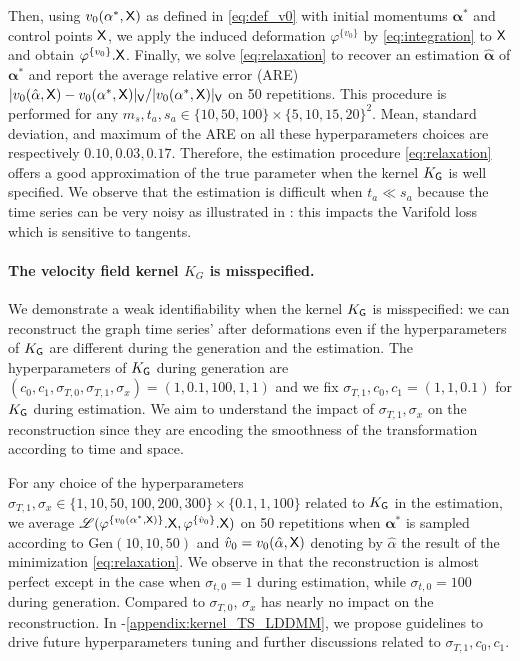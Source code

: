 Then, using $v_0(\mathbf{\alpha}^*,\mathsf{X})$ as defined in \eqref{eq:def_v0} with initial momentums $\mathbf{\alpha}^*$ and control points $\mathsf{X}$, we apply the induced deformation $\varphi^{\{v_0\}} $ by \eqref{eq:integration} to $\mathsf{X}$ and obtain $\varphi^{\{v_0\}}.\mathsf{X}$.
Finally, we solve \eqref{eq:relaxation} to recover an estimation $\hat{\mathbf{\alpha}}$ of $\mathbf{\alpha}^*$ and report the average relative error (ARE) $|v_0(\hat{\mathbf{\alpha}},\mathsf{X})-v_0(\mathbf{\alpha}^*,\mathsf{X})|_{\mathsf{V}}/|v_0(\mathbf{\alpha}^*,\mathsf{X})|_{\mathsf{V}}$ on 50 repetitions.
This procedure is performed for any $m_{s},t_{a},s_{a}\in \{10,50,100\}\times \{5,10,15,20\}^2 $.
Mean, standard deviation, and maximum of the ARE on all these hyperparameters choices are respectively $\mathbf{0.10, 0.03, 0.17}$.
Therefore, the estimation procedure \eqref{eq:relaxation} offers a good approximation of the true parameter when the kernel $K_{\mathsf{G}}$ is well specified.
We observe that the estimation is difficult when $t_a\ll s_a$ because the time series can be very noisy as illustrated in : this impacts the Varifold loss which is sensitive to tangents.

\paragraph{The velocity field kernel $K_G$ is misspecified.}

We demonstrate a weak identifiability when the kernel $K_{\mathsf{G}}$ is misspecified: we can reconstruct the graph time series' after deformations even if the hyperparameters of $K_{\mathsf{G}}$
are different during the generation and the estimation.
 The hyperparameters of $K_{\mathsf{G}}$ during generation are $(c_0,c_1,\sigma_{T,0},\sigma_{T,1},\sigma_x)=(1,0.1,100,1,1)$ and we fix $\sigma_{T,1},c_0,c_1=(1,1,0.1) $ for $K_{\mathsf{G}}$ during estimation.
 We aim to understand the impact of $\sigma_{T,1},\sigma_x$ on the reconstruction since they are encoding the smoothness of the transformation according to time and space.  

For any choice of the hyperparameters $\sigma_{T,1},\sigma_x\in \{1,10,50,100,200,300 \}\times \{0.1,1,100\}$ related to $K_{\mathsf{G}}$ in the estimation,
we average $\mathscr{L}(\varphi^{\{v_0(\mathbf{\alpha}^*,\mathsf{X})\}}.\mathsf{X},\varphi^{\{\hat{v}_0\}}.\mathsf{X})$ on 50 repetitions when $\mathbf{\alpha}^*$ is sampled according to Gen$(10,10,50)$ and $\hat{v}_0=v_0(\hat{\alpha},\mathsf{X})$ denoting by $\hat{\alpha}$ the result of the minimization \eqref{eq:relaxation}.
We observe in  that the reconstruction is almost perfect except in the case when $\sigma_{t,0}=1$ during estimation, while $ \sigma_{t,0}=100$ during generation.
Compared to $\sigma_{T,0}$, $\sigma_x$ has nearly no impact on the reconstruction.
In -\ref{appendix:kernel_TS_LDDMM}, we propose guidelines to drive future hyperparameters tuning and further discussions related to $\sigma_{T,1},c_0,c_1$. 

